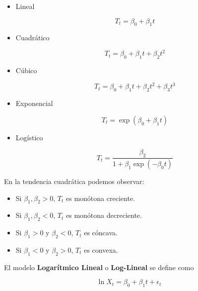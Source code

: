 \documentclass[12pt,]{krantz}
\providecommand{\tightlist}{%
  \setlength{\itemsep}{0pt}\setlength{\parskip}{0pt}}
\theoremstyle{definition}
\theoremstyle{definition}
\theoremstyle{definition}
\theoremstyle{remark}
\let\BeginKnitrBlock\begin \let\EndKnitrBlock\end
\begin{document}
\begin{itemize}
\tightlist
\item
  Lineal

  \begin{equation}
  T_t=\beta_0+\beta_1t
  \label{eq:eq-modelo-lineal}
  \end{equation}
\item
  Cuadrático

  \begin{equation}
  T_t=\beta_0+\beta_1t+\beta_2t^2
  \label{eq:eq-modelo-cuadratico}
  \end{equation}
\item
  Cúbico

  \begin{equation}
  T_t=\beta_0+\beta_1t+\beta_2t^2+\beta_3t^3
  \label{eq:eq-modelo-cubico}
  \end{equation}
\item
  Exponencial

  \begin{equation}
  T_t=\exp(\beta_0+\beta_1t)
  \label{eq:eq-modelo-exponencial}
  \end{equation}
\item
  Logístico

  \begin{equation}
  T_t=\frac{\beta_2}{1+\beta_1\exp(-\beta_0t)}
  \label{eq:eq-modelo-logistico}
  \end{equation}
\end{itemize}

En la tendencia cuadrática podemos observar:

\begin{itemize}
\tightlist
\item
  Si \(\beta_1,\beta_2>0\), \(T_t\) es monótona creciente.
\item
  Si \(\beta_1,\beta_2<0\), \(T_t\) es monótona decreciente.
\item
  Si \(\beta_1>0\) y \(\beta_2<0\), \(T_t\) es cóncava.
\item
  Si \(\beta_1<0\) y \(\beta_2>0\), \(T_t\) es convexa.
\end{itemize}

\BeginKnitrBlock{definition}
\protect\hypertarget{def:defi-modelo-log-lineal}{}{\label{def:defi-modelo-log-lineal}
}El modelo \textbf{Logarítmico Lineal} o \textbf{Log-Lineal} se define
como

\begin{equation}
\ln X_t = \beta_0+\beta_1t + \epsilon_t
\label{eq:eq-modelo-log-lineal}
\end{equation}
\EndKnitrBlock{definition}
\end{document}
